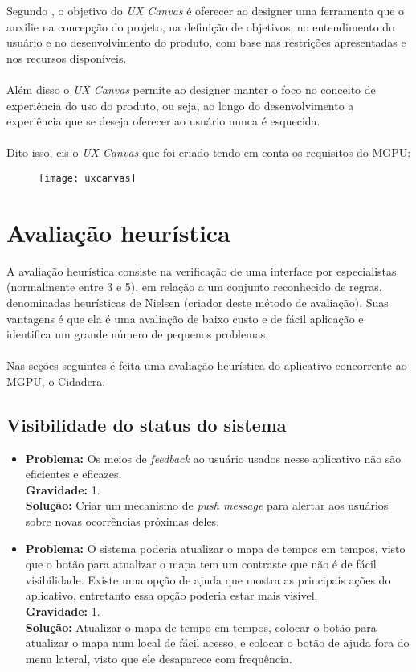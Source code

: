 \documentclass[a4paper,12pt,twoside]{report}
\begin{document}
Segundo \cite{R2}, o objetivo do \textit{UX Canvas} é oferecer ao designer uma ferramenta que o auxilie na concepção do projeto, na definição de objetivos, no entendimento do usuário e no desenvolvimento do produto, com base nas restrições apresentadas e nos recursos disponíveis.
\\~\\
Além disso o \textit{UX Canvas} permite ao designer manter o foco no conceito de experiência do uso do produto, ou seja, ao longo do desenvolvimento a experiência que se deseja oferecer ao usuário nunca é esquecida.\cite{R2}
\\~\\
Dito isso, eis o \textit{UX Canvas} que foi criado tendo em conta os requisitos do MGPU: 
\begin{figure}[!ht]
\centering
\texttt{[image: uxcanvas]}
\end{figure}

\chapter{Avaliação heurística}
A avaliação heurística consiste na verificação de uma interface por especialistas (normalmente entre 3 e 5), em relação a um conjunto reconhecido de regras, denominadas heurísticas de Nielsen (criador deste método de avaliação). Suas vantagens é que ela é uma avaliação de baixo custo e de fácil aplicação e identifica um grande número de pequenos problemas.\cite{R0}
\\~\\
Nas seções seguintes é feita uma avaliação heurística do aplicativo concorrente ao MGPU, o Cidadera\cite{R1}.

\section{Visibilidade do status do sistema}
\begin{itemize}
\item \textbf{Problema:} Os meios de \textit{feedback} ao usuário usados nesse aplicativo não são eficientes e eficazes.\\
  \textbf{Gravidade:} 1.\\
  \textbf{Solução:} Criar um mecanismo de \textit{push message} para alertar aos usuários sobre
novas ocorrências próximas deles.
\item \textbf{Problema:} O sistema poderia atualizar o mapa de tempos em tempos, visto que
  o botão para atualizar o mapa tem um contraste que não é de fácil visibilidade. Existe uma opção de ajuda
  que mostra as principais ações do
aplicativo, entretanto essa opção poderia estar mais visível.\\
\textbf{Gravidade:} 1.\\
\textbf{Solução:} Atualizar o mapa de tempo em tempos, colocar o botão para atualizar o
mapa num local de fácil acesso, e colocar o botão de ajuda fora
do menu lateral, visto que ele desaparece com frequência.
\end{itemize}
\end{document}
